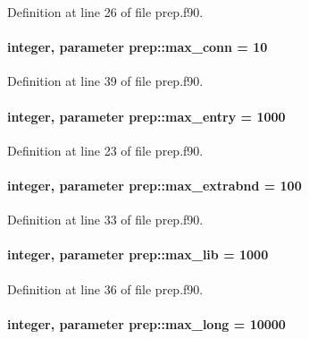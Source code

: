 Definition at line 26 of file prep.\-f90.

\hypertarget{classprep_ae00ce511ccdd1623a7fded5f4cdb237a}{
\paragraph[{max\-\_\-conn}]{\setlength{\rightskip}{0pt plus 5cm}integer, parameter prep\-::max\-\_\-conn = 10}}\label{classprep_ae00ce511ccdd1623a7fded5f4cdb237a}


Definition at line 39 of file prep.\-f90.

\hypertarget{classprep_ac8c3b3f850c904ceb431889c42d85ee2}{
\paragraph[{max\-\_\-entry}]{\setlength{\rightskip}{0pt plus 5cm}integer, parameter prep\-::max\-\_\-entry = 1000}}\label{classprep_ac8c3b3f850c904ceb431889c42d85ee2}


Definition at line 23 of file prep.\-f90.

\hypertarget{classprep_a0954fb2199580b767b0fec5e0d190eb0}{
\paragraph[{max\-\_\-extrabnd}]{\setlength{\rightskip}{0pt plus 5cm}integer, parameter prep\-::max\-\_\-extrabnd = 100}}\label{classprep_a0954fb2199580b767b0fec5e0d190eb0}


Definition at line 33 of file prep.\-f90.

\hypertarget{classprep_afddd5b41836da73acf6f6d7b66741283}{
\paragraph[{max\-\_\-lib}]{\setlength{\rightskip}{0pt plus 5cm}integer, parameter prep\-::max\-\_\-lib = 1000}}\label{classprep_afddd5b41836da73acf6f6d7b66741283}


Definition at line 36 of file prep.\-f90.

\hypertarget{classprep_a1df01e5c34db215d69c53f52185163a5}{
\paragraph[{max\-\_\-long}]{\setlength{\rightskip}{0pt plus 5cm}integer, parameter prep\-::max\-\_\-long = 10000}}\label{classprep_a1df01e5c34db215d69c53f52185163a5}


